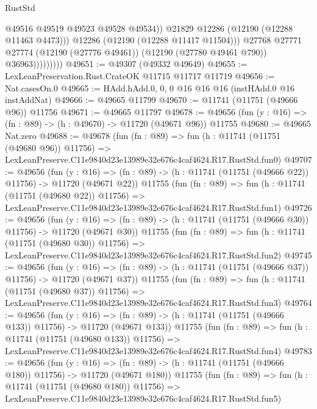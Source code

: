 \begin{lexlean}{RustStd}
\begin{coremodule}
                              @49516
                              @49519
                              @49523
                              @49528
                              @49534))
                          @21829
                          @12286
                          (@12190 (@12288 @11463 @4473)))
                        @12286
                        (@12190 (@12288 @11417 @11504)))
                      @27768
                      @27771
                      @27774
                      (@12190 (@27776 @49461))
                      (@12190 (@27780 @49461 @790))
                      @36963)))))))))
@49651 := @49307 (@49332 @49649)
@49655 := LexLeanPreservation.Rust.CrateOK @11715 @11717 @11719
@49656 := Nat.casesOn.{0}
@49665 := HAdd.hAdd.{0, 0, 0} @16 @16 @16 (instHAdd.{0} @16 instAddNat)
@49666 := @49665 @11799
@49670 := @11741 (@11751 (@49666 @96)) @11756
@49671 := @49665 @11797
@49678 := @49656 (fun (y : @16) => (fn : @89) -> (h : @49670) -> @11720 (@49671 @96)) @11755
@49680 := @49665 Nat.zero
@49688 := @49678
    (fun (fn : @89) =>
    fun (h : @11741 (@11751 (@49680 @96)) @11756) =>
    LexLeanPreserve.C11e9840d23e13989e32e676c4caf4624.R17.RustStd.fun0)
@49707 := @49656
    (fun (y : @16) =>
    (fn : @89) -> (h : @11741 (@11751 (@49666 @22)) @11756) -> @11720 (@49671 @22))
    @11755
    (fun (fn : @89) =>
    fun (h : @11741 (@11751 (@49680 @22)) @11756) =>
    LexLeanPreserve.C11e9840d23e13989e32e676c4caf4624.R17.RustStd.fun1)
@49726 := @49656
    (fun (y : @16) =>
    (fn : @89) -> (h : @11741 (@11751 (@49666 @30)) @11756) -> @11720 (@49671 @30))
    @11755
    (fun (fn : @89) =>
    fun (h : @11741 (@11751 (@49680 @30)) @11756) =>
    LexLeanPreserve.C11e9840d23e13989e32e676c4caf4624.R17.RustStd.fun2)
@49745 := @49656
    (fun (y : @16) =>
    (fn : @89) -> (h : @11741 (@11751 (@49666 @37)) @11756) -> @11720 (@49671 @37))
    @11755
    (fun (fn : @89) =>
    fun (h : @11741 (@11751 (@49680 @37)) @11756) =>
    LexLeanPreserve.C11e9840d23e13989e32e676c4caf4624.R17.RustStd.fun3)
@49764 := @49656
    (fun (y : @16) =>
    (fn : @89) -> (h : @11741 (@11751 (@49666 @133)) @11756) -> @11720 (@49671 @133))
    @11755
    (fun (fn : @89) =>
    fun (h : @11741 (@11751 (@49680 @133)) @11756) =>
    LexLeanPreserve.C11e9840d23e13989e32e676c4caf4624.R17.RustStd.fun4)
@49783 := @49656
    (fun (y : @16) =>
    (fn : @89) -> (h : @11741 (@11751 (@49666 @180)) @11756) -> @11720 (@49671 @180))
    @11755
    (fun (fn : @89) =>
    fun (h : @11741 (@11751 (@49680 @180)) @11756) =>
    LexLeanPreserve.C11e9840d23e13989e32e676c4caf4624.R17.RustStd.fun5)

\end{coremodule}
\end{lexlean}
